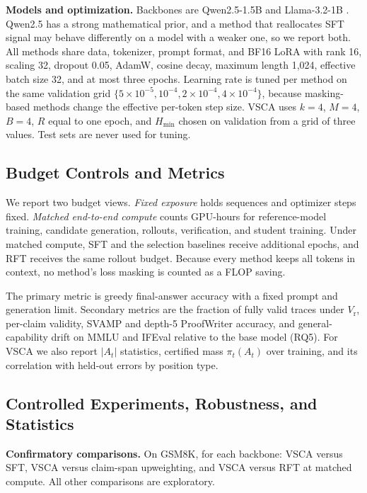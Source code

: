 \documentclass{article}
\newcommand{\vsca}{\textsc{VSCA}}
\newcommand{\acc}{A}
\theoremstyle{plain}
\theoremstyle{remark}
\begin{document}
\textbf{Models and optimization.} Backbones are Qwen2.5-1.5B \citep{qwen25} and Llama-3.2-1B \citep{llama3}. Qwen2.5 has a strong mathematical prior, and a method that reallocates SFT signal may behave differently on a model with a weaker one, so we report both. All methods share data, tokenizer, prompt format, and BF16 LoRA \citep{lora} with rank 16, scaling 32, dropout 0.05, AdamW, cosine decay, maximum length 1{,}024, effective batch size 32, and at most three epochs. Learning rate is tuned per method on the same validation grid $\{5\times10^{-5},10^{-4},2\times10^{-4},4\times10^{-4}\}$, because masking-based methods change the effective per-token step size. \vsca{} uses $k=4$, $M=4$, $B=4$, $R$ equal to one epoch, and $H_{\min}$ chosen on validation from a grid of three values. Test sets are never used for tuning.

\subsection{Budget Controls and Metrics}
\label{sec:metrics}
We report two budget views. \emph{Fixed exposure} holds sequences and optimizer steps fixed. \emph{Matched end-to-end compute} counts GPU-hours for reference-model training, candidate generation, rollouts, verification, and student training. Under matched compute, SFT and the selection baselines receive additional epochs, and RFT receives the same rollout budget. Because every method keeps all tokens in context, no method's loss masking is counted as a FLOP saving.

The primary metric is greedy final-answer accuracy with a fixed prompt and generation limit. Secondary metrics are the fraction of fully valid traces under $V_{\mathrm{r}}$, per-claim validity, SVAMP and depth-5 ProofWriter accuracy, and general-capability drift on MMLU and IFEval relative to the base model (RQ5). For \vsca{} we also report $|\acc_t|$ statistics, certified mass $\pi_t(\acc_t)$ over training, and its correlation with held-out errors by position type.

\subsection{Controlled Experiments, Robustness, and Statistics}
\label{sec:ablations}
\textbf{Confirmatory comparisons.} On GSM8K, for each backbone: \vsca{} versus SFT, \vsca{} versus claim-span upweighting, and \vsca{} versus RFT at matched compute. All other comparisons are exploratory.
\end{document}
